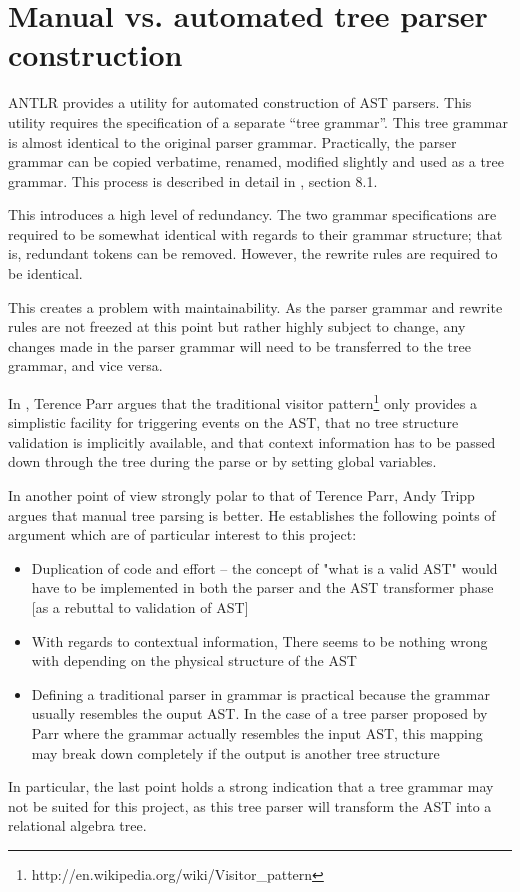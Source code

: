 \section{Manual vs. automated tree parser construction}
ANTLR provides a utility for automated construction of AST parsers. This
utility requires the specification of a separate ``tree grammar''. This tree
grammar is almost identical to the original parser grammar. Practically, the
parser grammar can be copied verbatime, renamed, modified slightly and used as
a tree  grammar. This process is described in detail in \cite{definitiveAntlr},
section 8.1.

This introduces a high level of redundancy. The two grammar specifications are
required to be somewhat identical with regards to their grammar structure; that
is,  redundant tokens can be removed. However, the rewrite rules are required to
be identical.

This creates a problem with maintainability. As the parser grammar and rewrite
rules are not freezed at this point but rather highly subject to change, any
changes made in the parser grammar will need to be transferred to the tree
grammar, and vice versa. 

In \cite{translators_should_use_tree_grammars}, Terence Parr argues that the
traditional visitor
pattern\footnote{http://en.wikipedia.org/wiki/Visitor\_pattern} only provides a
simplistic facility for triggering events on the AST, that no tree structure
validation is implicitly available, and that context information has to be
passed down through the tree during the parse or by setting global variables.

In another point of view strongly polar to that of Terence Parr, Andy Tripp
argues\cite{manual_tree_walking_is_better} that manual tree parsing is
better. He establishes the following points of argument which are of particular
interest to this project:
\begin{itemize}
  \item Duplication of code and effort -- the concept of "what is a valid AST"
  would have to be implemented in both the parser and the AST transformer phase
  [as a rebuttal to validation of AST]
  \item With regards to contextual information, There seems to be nothing wrong
  with depending on the physical structure of the AST 
  \item Defining a traditional parser in grammar is practical because the grammar
  usually resembles the ouput AST. In the case of a tree parser proposed by Parr
  where the grammar actually resembles the input AST, this mapping may break
  down completely if the output is another tree structure
\end{itemize}

In particular, the last point holds a strong indication that a tree grammar
may not be suited for this project, as this tree parser will transform the AST
into a relational algebra tree.
